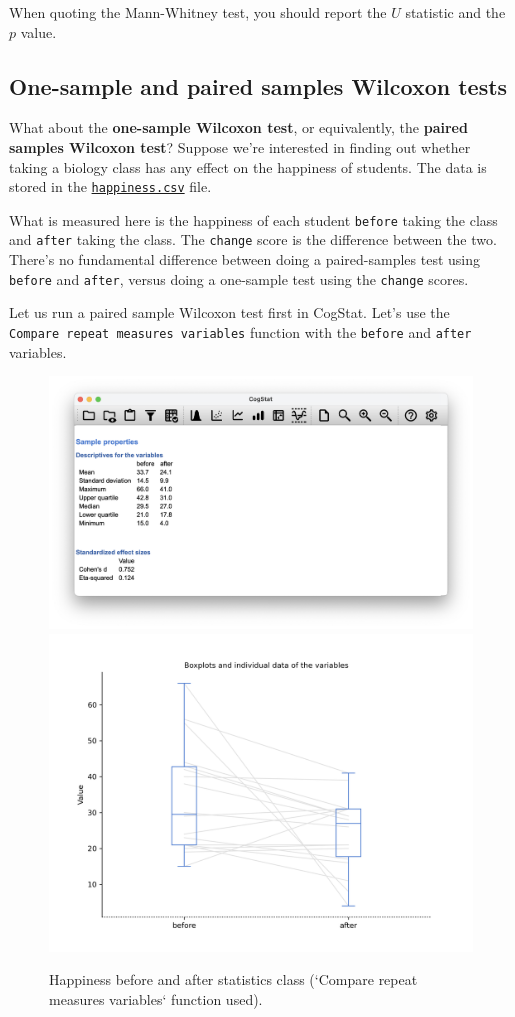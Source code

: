 \documentclass[
]{book}
\theoremstyle{definition}
\theoremstyle{definition}
\theoremstyle{definition}
\theoremstyle{definition}
\theoremstyle{remark}
\begin{document}
When quoting the Mann-Whitney test, you should report the \(U\) statistic and the \(p\) value.

\hypertarget{wilcoxon}{%
\subsection{One-sample and paired samples Wilcoxon tests}\label{wilcoxon}}

What about the \textbf{one-sample Wilcoxon test}, or equivalently, the \textbf{paired samples Wilcoxon test}? Suppose we're interested in finding out whether taking a biology class has any effect on the happiness of students. The data is stored in the \href{resources/data/happiness.csv}{\texttt{happiness.csv}} file.

What is measured here is the happiness of each student \texttt{before} taking the class and \texttt{after} taking the class. The \texttt{change} score is the difference between the two. There's no fundamental difference between doing a paired-samples test using \texttt{before} and \texttt{after}, versus doing a one-sample test using the \texttt{change} scores.

Let us run a paired sample Wilcoxon test first in CogStat. Let's use the \texttt{Compare\ repeat\ measures\ variables} function with the \texttt{before} and \texttt{after} variables.

\begin{figure}

{\centering \includegraphics[width=0.66\linewidth]{resources/image/cogstathappinessdescr} \includegraphics[width=0.66\linewidth]{resources/image/cogstathappinessbox} 

}

\caption{Happiness before and after statistics class (`Compare repeat measures variables` function used).}\label{fig:mwbeforeafter}
\end{figure}
\end{document}
